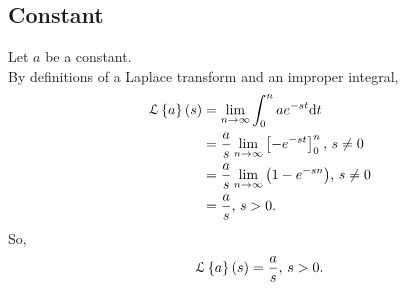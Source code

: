 \subsection{Constant}
Let $a$ be a constant.\\
By definitions of a Laplace transform and an improper integral,
\begin{align*}
	\mathcal{L}\left\{ a \right\}\left(s\right) &= \lim\limits_{n\to\infty}{\int_{0}^{n}{ae^{-st}\mathrm{d}t}} \\
	&= \frac{a}{s}\lim\limits_{n\to\infty}\left[-e^{-st}\right]_{0}^{n} \text{, } s \neq 0 \\
	&= \frac{a}{s}\lim\limits_{n\to\infty}{\left(1-e^{-sn}\right)} \text{, } s \neq 0 \\
	&= \frac{a}{s} \text{, } s > 0.
\end{align*}
So,
\begin{equation*}
	\mathcal{L}\left\{ a \right\}\left(s\right) = \frac{a}{s} \text{, } s > 0.
\end{equation*}